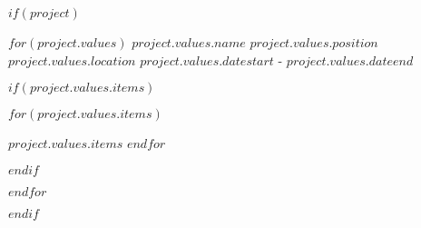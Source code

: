 \documentclass[18pt, letterpaper]{awesome-cv}
\begin{document}
$if(project)$
\begin{cventries}


$for(project.values)$
\cventry
{$project.values.name$}
{$project.values.position$}
{$project.values.location$}
{$project.values.datestart$ - $project.values.dateend$}
{
$if(project.values.items)$
\begin{cvitems}
$for(project.values.items)$
    \item{$project.values.items$}
$endfor$
\end{cvitems}
$endif$
}
\vspace{6mm}
$endfor$
\end{cventries}
$endif$
\end{document}

